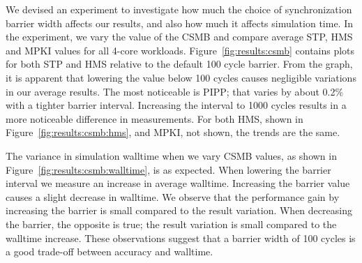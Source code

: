 We devised an experiment to investigate how much the choice of synchronization barrier width affects our results, and also how much it affects simulation time.
In the experiment, we vary the value of the CSMB and compare average STP, HMS and MPKI values for all 4-core workloads.
Figure~\ref{fig:results:csmb} contains plots for both STP and HMS relative to the default 100 cycle barrier.
From the graph, it is apparent that lowering the value below 100 cycles causes negligible variations in our average results. 
The most noticeable is PIPP; that varies by about 0.2\% with a tighter barrier interval.
Increasing the interval to 1000 cycles results in a more noticeable difference in measurements.
For both HMS, shown in Figure~\ref{fig:results:csmb:hms}, and MPKI, not shown, the trends are the same.

The variance in simulation walltime when we vary CSMB values, as shown in Figure~\ref{fig:results:csmb:walltime}, is as expected. 
When lowering the barrier interval we measure an increase in average walltime.
Increasing the barrier value causes a slight decrease in walltime.
We observe that the performance gain by increasing the barrier is small compared to the result variation. 
When decreasing the barrier, the opposite is true; the result variation is small compared to the walltime increase.
These observations suggest that a barrier width of 100 cycles is a good trade-off between accuracy and walltime.